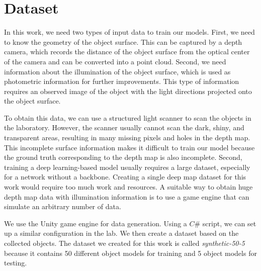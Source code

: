 
\chapter{Dataset} %

\label{ch:04} %


In this work, we need two types of input data to train our models. 
First, we need to know the geometry of the object surface. This can be captured by a depth camera, which records the distance of the object surface from the optical center of the camera and can be converted into a point cloud. 
Second, we need information about the illumination of the object surface, which is used as photometric information for further improvements. 
This type of information requires an observed image of the object with the light directions projected onto the object surface. 

To obtain this data, we can use a structured light scanner to scan the objects in the laboratory. However, the scanner usually cannot scan the dark, shiny, and transparent areas, resulting in many missing pixels and holes in the depth map. This incomplete surface information makes it difficult to train our model because the ground truth corresponding to the depth map is also incomplete. Second, training a deep learning-based model usually requires a large dataset, especially for a network without a backbone. Creating a single deep map dataset for this work would require too much work and resources. A suitable way to obtain huge depth map data with illumination information is to use a game engine that can simulate an arbitrary number of data.

We use the Unity game engine for data generation. Using a $ C\# $ script, we can set up a similar configuration in the lab. We then create a dataset based on the collected objects. The dataset we created for this work is called \textit{synthetic-50-5} because it contains 50 different object models for training and 5 object models for testing.

